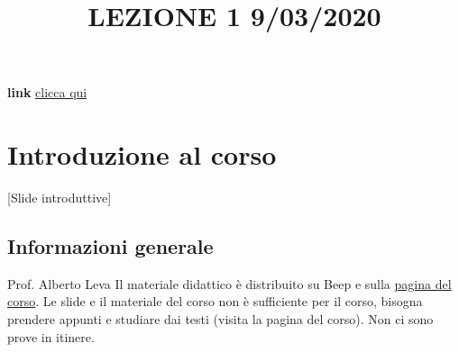 \title{LEZIONE 1 9/03/2020}\newline
\textbf{link} \href{https://web.microsoftstream.com/video/6164a9b1-4d0a-4f37-a279-2e0ec1e8ca25?list=user&userId=faa91214-a6f5-40d7-8875-253fd49b8ce1}{clicca qui}
\section{Introduzione al corso}
[Slide introduttive]
\subsection{Informazioni generale}
Prof. Alberto Leva \newline
\newline
Il materiale didattico è distribuito su Beep e sulla \href{http://home.deib.polimi.it/leva/}{pagina del corso}.\newline
\newline
Le slide e il materiale del corso non è sufficiente per il corso, bisogna prendere appunti e studiare dai testi (visita la pagina del corso).\newline
\newline
Non ci sono prove in itinere.
\subsection{}